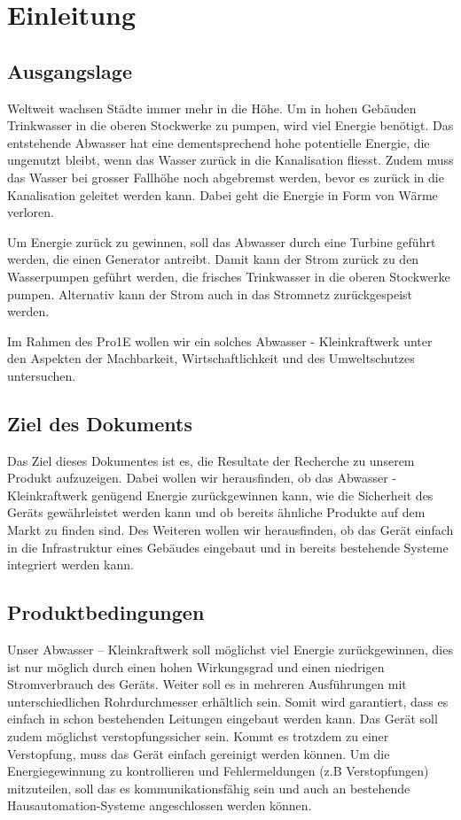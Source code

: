\section{Einleitung}

\subsection{Ausgangslage}

Weltweit wachsen Städte immer mehr in die Höhe. Um in hohen Gebäuden Trinkwasser in die oberen Stockwerke zu pumpen, wird viel Energie benötigt. Das entstehende Abwasser hat eine dementsprechend hohe potentielle Energie, die ungenutzt bleibt, wenn das Wasser zurück in die Kanalisation fliesst. Zudem muss das Wasser bei grosser Fallhöhe noch abgebremst werden, bevor es zurück in die Kanalisation geleitet werden kann. Dabei geht die Energie in Form von Wärme verloren. 

Um Energie zurück zu gewinnen, soll das Abwasser durch eine Turbine geführt werden, die einen Generator antreibt. Damit kann der Strom zurück zu den Wasserpumpen geführt werden, die frisches Trinkwasser in die oberen Stockwerke pumpen. Alternativ kann der Strom auch in das Stromnetz zurückgespeist werden. 

Im Rahmen des Pro1E wollen wir ein solches Abwasser - Kleinkraftwerk unter den Aspekten der Machbarkeit, Wirtschaftlichkeit und des Umweltschutzes untersuchen.  

\subsection{Ziel des Dokuments}

Das Ziel dieses Dokumentes ist es, die Resultate der Recherche zu unserem Produkt aufzuzeigen. Dabei wollen wir herausfinden, ob das Abwasser - Kleinkraftwerk genügend Energie zurückgewinnen kann, wie die Sicherheit des Geräts gewährleistet werden kann und ob bereits ähnliche Produkte auf dem Markt zu finden sind. Des Weiteren wollen wir herausfinden, ob das Gerät einfach in die Infrastruktur eines Gebäudes eingebaut und in bereits bestehende Systeme integriert werden kann.

\subsection{Produktbedingungen}

Unser Abwasser – Kleinkraftwerk soll möglichst viel Energie zurückgewinnen, dies ist nur möglich durch einen hohen Wirkungsgrad und einen niedrigen Stromverbrauch des Geräts. Weiter soll es in mehreren Ausführungen mit unterschiedlichen Rohrdurchmesser erhältlich sein. Somit wird garantiert, dass es einfach in schon bestehenden Leitungen eingebaut werden kann. Das Gerät soll zudem möglichst verstopfungssicher sein. Kommt es trotzdem zu einer Verstopfung, muss das Gerät einfach gereinigt werden können. Um die Energiegewinnung zu kontrollieren und Fehlermeldungen (z.B Verstopfungen) mitzuteilen, soll das es kommunikationsfähig sein und auch an bestehende Hausautomation-Systeme angeschlossen werden können.


